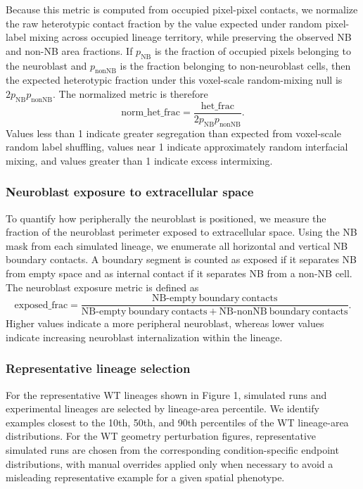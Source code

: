 Because this metric is computed from occupied pixel-pixel contacts, we normalize the raw heterotypic contact fraction by the value expected under random pixel-label mixing across occupied lineage territory, while preserving the observed NB and non-NB area fractions.
If \(p_{\mathrm{NB}}\) is the fraction of occupied pixels belonging to the neuroblast and \(p_{\mathrm{nonNB}}\) is the fraction belonging to non-neuroblast cells, then the expected heterotypic fraction under this voxel-scale random-mixing null is \(2 p_{\mathrm{NB}} p_{\mathrm{nonNB}}\).
The normalized metric is therefore
\[
\mathrm{norm\_het\_frac} = \frac{\mathrm{het\_frac}}{2 p_{\mathrm{NB}} p_{\mathrm{nonNB}}}.
\]
Values less than 1 indicate greater segregation than expected from voxel-scale random label shuffling, values near 1 indicate approximately random interfacial mixing, and values greater than 1 indicate excess intermixing.

\subsubsection{Neuroblast exposure to extracellular space}

To quantify how peripherally the neuroblast is positioned, we measure the fraction of the neuroblast perimeter exposed to extracellular space.
Using the NB mask from each simulated lineage, we enumerate all horizontal and vertical NB boundary contacts.
A boundary segment is counted as exposed if it separates NB from empty space and as internal contact if it separates NB from a non-NB cell.
The neuroblast exposure metric is defined as
\[
\mathrm{exposed\_frac} = \frac{\mathrm{NB\mbox{-}empty\ boundary\ contacts}}{\mathrm{NB\mbox{-}empty\ boundary\ contacts} + \mathrm{NB\mbox{-}nonNB\ boundary\ contacts}}.
\]
Higher values indicate a more peripheral neuroblast, whereas lower values indicate increasing neuroblast internalization within the lineage.

\subsubsection{Representative lineage selection}

For the representative WT lineages shown in Figure 1, simulated runs and experimental lineages are selected by lineage-area percentile.
We identify examples closest to the 10th, 50th, and 90th percentiles of the WT lineage-area distributions.
For the WT geometry perturbation figures, representative simulated runs are chosen from the corresponding condition-specific endpoint distributions, with manual overrides applied only when necessary to avoid a misleading representative example for a given spatial phenotype.
